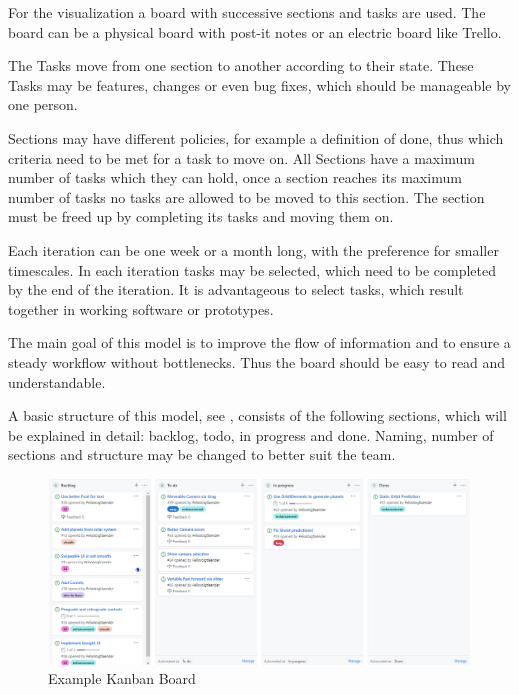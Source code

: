 \documentclass[runningheads]{llncs}
\begin{document}
For the visualization a board with successive sections and tasks are used. The board can be a physical board with post-it notes or an electric 
board like Trello. 

The Tasks move from one section to another according to their state. These Tasks may be features, changes or even bug fixes, which should be 
manageable by one person. 

Sections may have different policies, for example a definition of done, thus which criteria need to be met for a task to move on. All Sections
have a maximum number of tasks which they can hold, once a section reaches its maximum number of tasks no tasks are allowed to be moved to 
this section. The section must be freed up by completing its tasks and moving them on.

Each iteration can be one week or a month long, with the preference for smaller timescales. In each iteration tasks may be selected, 
which need to be completed by the end of the iteration. It is advantageous to select tasks, which result together in working software or prototypes.

The main goal of this model is to improve the flow of information and to ensure a steady workflow without bottlenecks. Thus the board should 
be easy to read and understandable. 

A basic structure of this model, see , consists of the following sections, which will be explained in detail: 
backlog, todo, in progress and done. Naming, number of sections and structure may be changed to better suit the team.

\begin{figure}[!htb]
  \centering
  \begin{minipage}{1\textwidth}
      \centering
      \includegraphics[width=1\textwidth]{Kanban.PNG}
      \caption{Example Kanban Board}
      \label{fig:kanban}
  \end{minipage}%
\end{figure}
\end{document}
